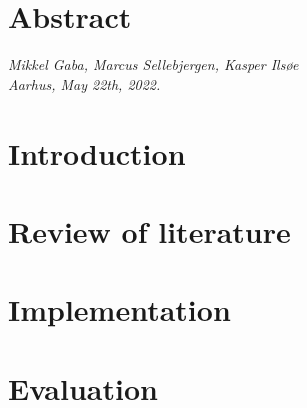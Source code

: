 \documentclass[11pt,openright]{report}
\theoremstyle{definition}
\begin{document}
\pagestyle{plain}
\chapter*{Abstract}



\vspace{2ex}
\begin{flushright}
  \emph{Mikkel Gaba, Marcus Sellebjergen, Kasper Ils{\o}e}\\
  \emph{Aarhus, May 22th, 2022.}
\end{flushright}

\tableofcontents
\cleardoublepage
{}
\setcounter{secnumdepth}{2}


\chapter{Introduction}
\label{ch:intro}





\chapter{Review of literature}
\label{ch:main1}









\chapter{Implementation}
\label{ch:main2}









\chapter{Evaluation}
\label{ch:main3}
\end{document}
